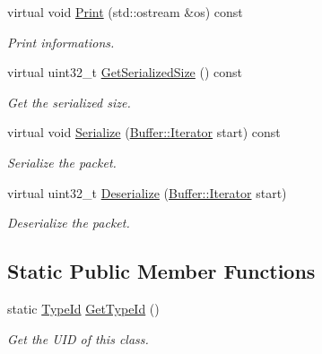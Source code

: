 \begin{DoxyCompactItemize}
virtual void \hyperlink{classns3_1_1Icmpv6OptionHeader_a03b9b230089964dac065af73fa19f12f}{Print} (std\+::ostream \&os) const 
\begin{DoxyCompactList}\small\item\em Print informations. \end{DoxyCompactList}\item 
virtual uint32\+\_\+t \hyperlink{classns3_1_1Icmpv6OptionHeader_ae3aa5b956415f7b6b321c8cd8ac6e1c6}{Get\+Serialized\+Size} () const 
\begin{DoxyCompactList}\small\item\em Get the serialized size. \end{DoxyCompactList}\item 
virtual void \hyperlink{classns3_1_1Icmpv6OptionHeader_aa2797745de760e71a09252c5ea68b018}{Serialize} (\hyperlink{classns3_1_1Buffer_1_1Iterator}{Buffer\+::\+Iterator} start) const 
\begin{DoxyCompactList}\small\item\em Serialize the packet. \end{DoxyCompactList}\item 
virtual uint32\+\_\+t \hyperlink{classns3_1_1Icmpv6OptionHeader_adb7a895b79c9a492b9b626e1adc40384}{Deserialize} (\hyperlink{classns3_1_1Buffer_1_1Iterator}{Buffer\+::\+Iterator} start)
\begin{DoxyCompactList}\small\item\em Deserialize the packet. \end{DoxyCompactList}\end{DoxyCompactItemize}
\subsection*{Static Public Member Functions}
\begin{DoxyCompactItemize}
\item 
static \hyperlink{classns3_1_1TypeId}{Type\+Id} \hyperlink{classns3_1_1Icmpv6OptionHeader_ac0bced9dbc10ea3208f8757ac0e16da3}{Get\+Type\+Id} ()
\begin{DoxyCompactList}\small\item\em Get the U\+ID of this class. \end{DoxyCompactList}\end{DoxyCompactItemize}

